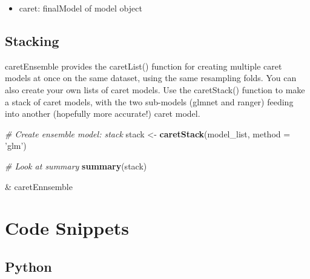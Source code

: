 \documentclass[]{book}
\newenvironment{Shaded}{\begin{snugshade}}{\end{snugshade}}
\newcommand{\KeywordTok}[1]{\textcolor[rgb]{0.13,0.29,0.53}{\textbf{#1}}}
\newcommand{\DataTypeTok}[1]{\textcolor[rgb]{0.13,0.29,0.53}{#1}}
\newcommand{\StringTok}[1]{\textcolor[rgb]{0.31,0.60,0.02}{#1}}
\newcommand{\CommentTok}[1]{\textcolor[rgb]{0.56,0.35,0.01}{\textit{#1}}}
\newcommand{\OtherTok}[1]{\textcolor[rgb]{0.56,0.35,0.01}{#1}}
\newcommand{\OperatorTok}[1]{\textcolor[rgb]{0.81,0.36,0.00}{\textbf{#1}}}
\newcommand{\NormalTok}[1]{#1}
\providecommand{\tightlist}{%
  \setlength{\itemsep}{0pt}\setlength{\parskip}{0pt}}
\theoremstyle{definition}
\theoremstyle{definition}
\theoremstyle{definition}
\theoremstyle{remark}
\begin{document}
\begin{Shaded}
\end{Shaded}

\begin{itemize}
\tightlist
\item
  caret: finalModel of model object
\end{itemize}

\section{Stacking}\label{stacking}

caretEnsemble provides the caretList() function for creating multiple
caret models at once on the same dataset, using the same resampling
folds. You can also create your own lists of caret models. Use the
caretStack() function to make a stack of caret models, with the two
sub-models (glmnet and ranger) feeding into another (hopefully more
accurate!) caret model.

\begin{Shaded}
\begin{Highlighting}[]
\CommentTok{# Create ensemble model: stack}
\NormalTok{stack <-}\StringTok{ }\KeywordTok{caretStack}\NormalTok{(model_list, }\DataTypeTok{method =} \StringTok{'glm'}\NormalTok{)}

\CommentTok{# Look at summary}
\KeywordTok{summary}\NormalTok{(stack)}
\end{Highlighting}
\end{Shaded}

\& caretEnnsemble

\chapter*{Code Snippets}\label{code-snippets}

\section{Python}\label{python}
\end{document}
